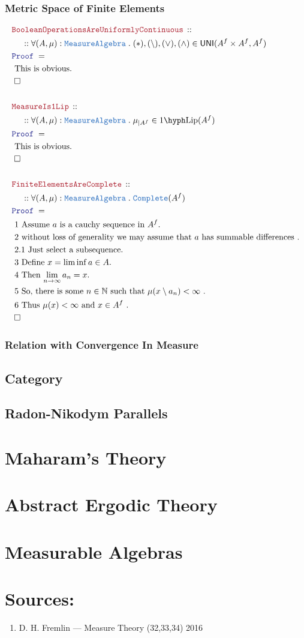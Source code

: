 \documentclass[12pt]{scrartcl}
\newcommand{\TYPE}[1]{\textcolor{NavyBlue}{\mathtt{#1}}}
\newcommand{\LOGIC}[1]{\textcolor{Blue}{\mathtt{#1}}}
\newcommand{\THM}[1]{\textcolor{Maroon}{\mathtt{#1}}}
\renewcommand{\.}{\; . \;}
\newcommand{\Theorem}[2]{& \THM{#1} \, :: \, #2 \\ & \Proof = \\ }
\newcommand{\NewLine}{\\ & \kern 1pc}
\newcommand{\Page}[1]{ \begin{align*} #1 \end{align*}   }
\newcommand{\Nat}{\mathbb{N} }
\newcommand{\QED}{\; \square}
\newcommand{\EndProof}{& \QED \\}
\newcommand{\Proof}{\LOGIC{Proof} \; }
\newcommand{\Explain}[1]{& \text{#1.} \\}
\newcommand{\Lip}[1]{#1\hyph\mathrm{Lip}}
\newcommand{\UNI}{\mathsf{UNI}}
\newcommand{\Complete}{\TYPE{Complete}}
\newcommand{\MA}{\TYPE{MeasureAlgebra}}
\begin{document}
\subsubsection{Metric Space of Finite Elements}
\Page{
	\Theorem{BooleanOperationsAreUniformlyContinuous}
	{
		\NewLine ::		
		\forall (A,\mu) : \MA \.  (*),(\setminus),(\vee),(\wedge) \in \UNI(A^f \times A^f, A^f)
	}
	\Explain{ This is obvious}
	\EndProof
	\\
	\Theorem{MeasureIs1Lip}
	{
		\NewLine ::		
		\forall (A,\mu) : \MA \.  \mu_{|A^f} \in \Lip{1}(A^f) 
	}
	\Explain{ This is obvious}
	\EndProof
	\\
	\Theorem{FiniteElementsAreComplete}
	{
		\NewLine ::		
		\forall (A,\mu) : \MA \.  \Complete(A^f) 
	}
	\Explain{ 1 Assume $a$ is a cauchy sequence in $A^f$}
	\Explain{ 2 without loss of generality we may assume that $a$ has summable differences }
	\Explain{ 2.1 Just select a subsequence}
	\Explain{ 3 Define $x = \lim \inf a \in A$}
	\Explain{ 4 Then $\lim_{n \to \infty} a_n = x $}
	\Explain{ 5 So, there is some $n \in \Nat$ such that  $\mu(x \setminus a_n) < \infty$ }
	\Explain{ 6 Thus $\mu(x) < \infty$ and $x \in A^f$ }
	\EndProof
}
\newpage
\subsubsection{Relation with Convergence In Measure}
\subsection{Category}
\subsection{Radon-Nikodym Parallels}
\section{Maharam's Theory}
\section{Abstract Ergodic Theory}
\section{Measurable Algebras}
\newpage
\section*{Sources:}
\begin{enumerate}
\item  D. H. Fremlin --- Measure Theory (32,33,34) 2016
\end{enumerate}
\end{document}
